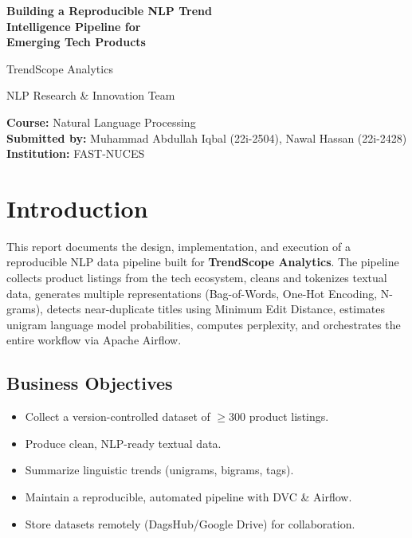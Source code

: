 \documentclass[12pt,a4paper]{article}
\begin{document}
\begin{titlepage}
  \centering
  \vspace*{2cm}
  {\Huge\bfseries Building a Reproducible NLP Trend\\Intelligence Pipeline for\\Emerging Tech Products\par}
  \vspace{1.5cm}
  {\Large TrendScope Analytics\par}
  \vspace{1cm}
  {\large NLP Research \& Innovation Team\par}
  \vspace{2cm}
  {\large
    \textbf{Course:} Natural Language Processing\\[0.3cm]
    \textbf{Submitted by:} Muhammad Abdullah Iqbal (22i-2504), Nawal Hassan (22i-2428)\\[0.3cm]
    \textbf{Institution:} FAST-NUCES\\[0.3cm]
  }
  \vspace{2cm}

\end{titlepage}

\tableofcontents
\newpage

\section{Introduction}

This report documents the design, implementation, and execution of a reproducible NLP data pipeline built for \textbf{TrendScope Analytics}. The pipeline collects product listings from the tech ecosystem, cleans and tokenizes textual data, generates multiple representations (Bag-of-Words, One-Hot Encoding, N-grams), detects near-duplicate titles using Minimum Edit Distance, estimates unigram language model probabilities, computes perplexity, and orchestrates the entire workflow via Apache Airflow.

\subsection{Business Objectives}
\begin{itemize}
  \item Collect a version-controlled dataset of $\geq 300$ product listings.
  \item Produce clean, NLP-ready textual data.
  \item Summarize linguistic trends (unigrams, bigrams, tags).
  \item Maintain a reproducible, automated pipeline with DVC \& Airflow.
  \item Store datasets remotely (DagsHub/Google Drive) for collaboration.
\end{itemize}
\end{document}
